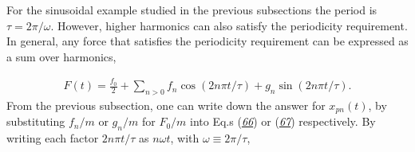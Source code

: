\documentclass[letterpaper,10pt,english]{sphinxmanual}
\begin{document}
\begin{sphinxVerbatim}[commandchars=\\\{\}]
   
 
   
   

  
  
  
     
  
  
 
 
\end{sphinxVerbatim}

For the sinusoidal example studied in the previous subsections the
period is \(\tau=2\pi/\omega\). However, higher harmonics can also
satisfy the periodicity requirement. In general, any force that
satisfies the periodicity requirement can be expressed as a sum over
harmonics,




\begin{equation*}
\begin{split}
\begin{equation}
F(t)=\frac{f_0}{2}+\sum_{n>0} f_n\cos(2n\pi t/\tau)+g_n\sin(2n\pi t/\tau).
\label{_auto62} \tag{81}
\end{equation}
\end{split}
\end{equation*}
From the previous subsection, one can write down the answer for
\(x_{pn}(t)\), by substituting \(f_n/m\) or \(g_n/m\) for \(F_0/m\) into Eq.s
({\hyperref[\detokenize{chapter1:eq:fastdriven1}]{\emph{66}}}) or ({\hyperref[\detokenize{chapter1:eq:fastdriven2}]{\emph{67}}}) respectively. By
writing each factor \(2n\pi t/\tau\) as \(n\omega t\), with \(\omega\equiv
2\pi/\tau\),
\end{document}
